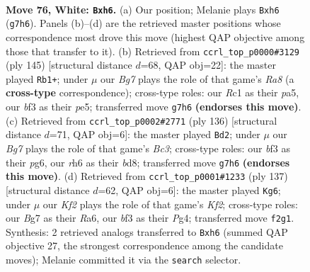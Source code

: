 \documentclass[11pt]{article}
\begin{document}
\clearpage

\begin{figure}[p]\centering
\begin{subfigure}{0.46\textwidth}\centering
\resizebox{\linewidth}{!}{%
\newchessgame
\chessboard[
  setfen={8/3k2B1/p2r3r/Ppp2p1p/2p2P1P/4PbP1/1P3K2/2R5 w - - 0 76},
  showmover=false,
  pgfstyle=straightmove, color=movearrow, markmove={g7-h6}
]}
\caption{}
\end{subfigure}\hfill
\begin{subfigure}{0.46\textwidth}\centering
\resizebox{\linewidth}{!}{%
\newchessgame
\chessboard[
  setfen={8/2k4p/2p3pP/P1p1PpP1/2PpbP2/1K6/R3B3/r7 b - - 16 73},
  showmover=false,
  pgfstyle=straightmove, color=movearrow, markmove={a1-b1}
]}
\caption{}
\end{subfigure}
\\[4pt]
\begin{subfigure}{0.46\textwidth}\centering
\resizebox{\linewidth}{!}{%
\newchessgame
\chessboard[
  setfen={3b4/8/1r1p2p1/1k1p1p1p/p2P3P/2B1P1P1/RP3P2/4K3 w - - 44 69},
  showmover=false,
  pgfstyle=straightmove, color=movearrow, markmove={c3-d2}
]}
\caption{}
\end{subfigure}\hfill
\begin{subfigure}{0.46\textwidth}\centering
\resizebox{\linewidth}{!}{%
\newchessgame
\chessboard[
  setfen={8/p4k2/r1p1p3/1p2Pp2/1P1P2p1/P1RK2P1/5P1r/5R2 b - - 7 69},
  showmover=false,
  pgfstyle=straightmove, color=movearrow, markmove={f7-g6}
]}
\caption{}
\end{subfigure}
\caption{\textbf{Move 76, White: \texttt{Bxh6}.} (a) Our position; Melanie plays \texttt{Bxh6} (\texttt{g7h6}). Panels (b)--(d) are the retrieved master positions whose correspondence most drove this move (highest QAP objective among those that transfer to it). (b) Retrieved from \texttt{ccrl\_top\_p0000\#3129} (ply 145) [structural distance $d$=68, QAP obj=22]: the master played \texttt{Rb1+}; under $\mu$ our \emph{Bg7} plays the role of that game's \emph{Ra8} (a \textbf{cross-type} correspondence); cross-type roles: our \emph{R}c1 as their \emph{p}a5, our \emph{b}f3 as their \emph{p}e5; transferred move \texttt{g7h6} \textbf{(endorses this move)}. (c) Retrieved from \texttt{ccrl\_top\_p0002\#2771} (ply 136) [structural distance $d$=71, QAP obj=6]: the master played \texttt{Bd2}; under $\mu$ our \emph{Bg7} plays the role of that game's \emph{Bc3}; cross-type roles: our \emph{b}f3 as their \emph{p}g6, our \emph{r}h6 as their \emph{b}d8; transferred move \texttt{g7h6} \textbf{(endorses this move)}. (d) Retrieved from \texttt{ccrl\_top\_p0001\#1233} (ply 137) [structural distance $d$=62, QAP obj=6]: the master played \texttt{Kg6}; under $\mu$ our \emph{Kf2} plays the role of that game's \emph{Kf2}; cross-type roles: our \emph{B}g7 as their \emph{R}a6, our \emph{b}f3 as their \emph{P}g4; transferred move \texttt{f2g1}. Synthesis: 2 retrieved analogs transferred to \texttt{Bxh6} (summed QAP objective 27, the strongest correspondence among the candidate moves); Melanie committed it via the \texttt{search} selector.}
\label{fig:thought-m150}
\end{figure}
\end{document}
